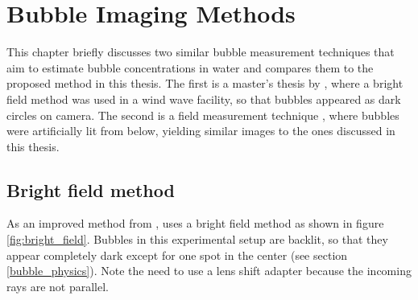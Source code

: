 
\chapter{Bubble Imaging Methods} \label{related_work}
 

This chapter briefly discusses two similar bubble measurement techniques that aim to estimate bubble concentrations in water and compares them to the proposed method in this thesis. The first is a master's thesis by \citet{Leonie}, where a bright field method was used in a wind wave facility, so that bubbles appeared as dark circles on camera. The second is a field measurement technique \citep{Al-Lashi2016}, where bubbles were artificially lit from below, yielding similar images to the ones discussed in this thesis. 

\section{Bright field method}
	As an improved method from \citet{MischlerDiss}, \citet{Leonie} uses a bright field method as shown in figure \ref{fig:bright_field}. Bubbles in this experimental setup are backlit, so that they appear completely dark except for one spot in the center (see section  \ref{bubble_physics}). Note the need to use a lens shift adapter because the incoming rays are not parallel. 
	
